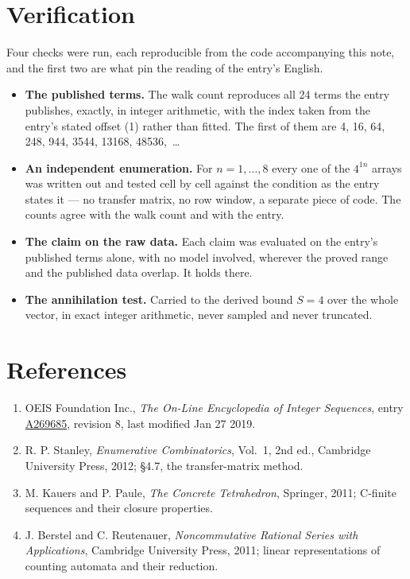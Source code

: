 \documentclass[11pt]{article}
\theoremstyle{definition}
\begin{document}
\section{Verification}

Four checks were run, each reproducible from the code accompanying this note, and the first two are what pin the reading of the entry's English.

\begin{itemize}

\item {\bfseries The published terms.} The walk count reproduces all 24 terms the entry publishes, exactly, in integer arithmetic, with the index taken from the entry's stated offset (1) rather than fitted. The first of them are 4, 16, 64, 248, 944, 3544, 13168, 48536,~\dots

\item {\bfseries An independent enumeration.} For $n = 1,\dots,8$ every one of the $4^{1n}$ arrays was written out and tested cell by cell against the condition as the entry states it --- no transfer matrix, no row window, a separate piece of code. The counts agree with the walk count and with the entry.

\item {\bfseries The claim on the raw data.} Each claim was evaluated on the entry's published terms alone, with no model involved, wherever the proved range and the published data overlap. It holds there.

\item {\bfseries The annihilation test.} Carried to the derived bound $S = 4$ over the whole vector, in exact integer arithmetic, never sampled and never truncated.

\end{itemize}

\section{References}

\begin{enumerate}

\item OEIS Foundation Inc., \emph{The On-Line Encyclopedia of Integer Sequences}, entry \href{https://oeis.org/A269685}{A269685}, revision 8, last modified Jan 27 2019.

\item R. P. Stanley, \emph{Enumerative Combinatorics}, Vol.~1, 2nd ed., Cambridge University Press, 2012; \S4.7, the transfer-matrix method.

\item M. Kauers and P. Paule, \emph{The Concrete Tetrahedron}, Springer, 2011; C-finite sequences and their closure properties.

\item J. Berstel and C. Reutenauer, \emph{Noncommutative Rational Series with Applications}, Cambridge University Press, 2011; linear representations of counting automata and their reduction.

\end{enumerate}
\end{document}
